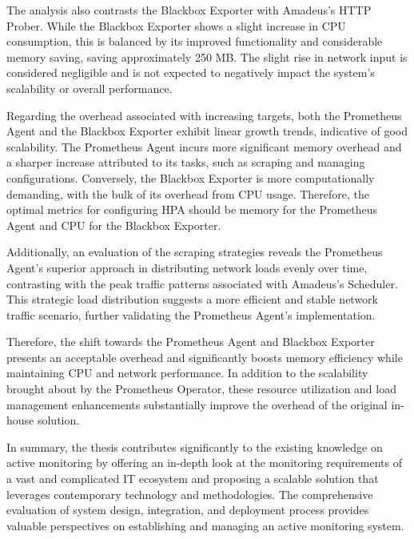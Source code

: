The analysis also contrasts the Blackbox Exporter with Amadeus's \ac{HTTP} Prober. While the Blackbox Exporter shows a slight increase in \ac{CPU} consumption, this is balanced by its improved functionality and considerable memory saving, saving approximately 250 MB. The slight rise in network input is considered negligible and is not expected to negatively impact the system's scalability or overall performance. 

Regarding the overhead associated with increasing targets, both the Prometheus Agent and the Blackbox Exporter exhibit linear growth trends, indicative of good scalability. The Prometheus Agent incurs more significant memory overhead and a sharper increase attributed to its tasks, such as scraping and managing configurations. Conversely, the Blackbox Exporter is more computationally demanding, with the bulk of its overhead from \ac{CPU} usage. Therefore, the optimal metrics for configuring \ac{HPA} should be memory for the Prometheus Agent and CPU for the Blackbox Exporter. 

Additionally, an evaluation of the scraping strategies reveals the Prometheus Agent's superior approach in distributing network loads evenly over time, contrasting with the peak traffic patterns associated with Amadeus's Scheduler. This strategic load distribution suggests a more efficient and stable network traffic scenario, further validating the Prometheus Agent's implementation. 

Therefore, the shift towards the Prometheus Agent and Blackbox Exporter presents an acceptable overhead and significantly boosts memory efficiency while maintaining \ac{CPU} and network performance. In addition to the scalability brought about by the Prometheus Operator, these resource utilization and load management enhancements substantially improve the overhead of the original in-house solution. 

In summary, the thesis contributes significantly to the existing knowledge on active monitoring by offering an in-depth look at the monitoring requirements of a vast and complicated IT ecosystem and proposing a scalable solution that leverages contemporary technology and methodologies. The comprehensive evaluation of system design, integration, and deployment process provides valuable perspectives on establishing and managing an active monitoring system. 